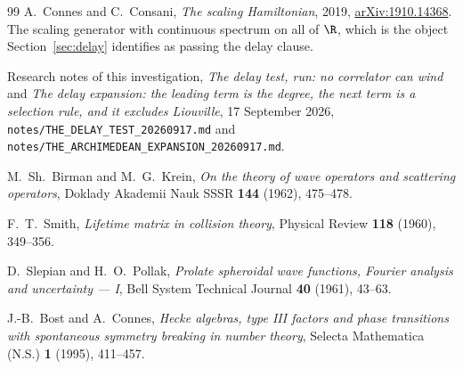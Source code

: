 \begin{thebibliography}{99}
A.~Connes and C.~Consani, \emph{The scaling Hamiltonian}, 2019,
\href{https://arxiv.org/abs/1910.14368}{arXiv:1910.14368}. The scaling generator
with continuous spectrum on all of $\R$, which is the object
Section~\ref{sec:delay} identifies as passing the delay clause.

Research notes of this investigation, \emph{The delay test, run: no correlator can
wind} and \emph{The delay expansion: the leading term is the degree, the next term
is a selection rule, and it excludes Liouville}, 17 September 2026,
\texttt{notes/THE\_DELAY\_TEST\_20260917.md} and
\texttt{notes/THE\_ARCHIMEDEAN\_EXPANSION\_20260917.md}.

M.~Sh.~Birman and M.~G.~Krein, \emph{On the theory of wave operators and
scattering operators}, Doklady Akademii Nauk SSSR \textbf{144} (1962), 475--478.

F.~T.~Smith, \emph{Lifetime matrix in collision theory}, Physical Review
\textbf{118} (1960), 349--356.

D.~Slepian and H.~O.~Pollak, \emph{Prolate spheroidal wave functions, Fourier
analysis and uncertainty --- I}, Bell System Technical Journal \textbf{40}
(1961), 43--63.

J.-B.~Bost and A.~Connes, \emph{Hecke algebras, type III factors and phase
transitions with spontaneous symmetry breaking in number theory}, Selecta
Mathematica (N.S.) \textbf{1} (1995), 411--457.
\end{thebibliography}

